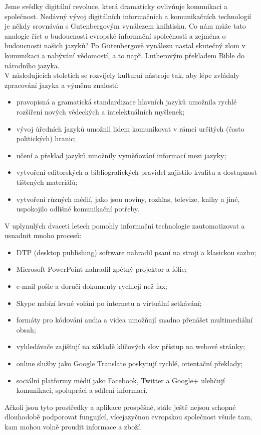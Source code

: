 \begin{multicols}{2}

Jsme svědky digitální revoluce, která dramaticky ovlivňuje komunikaci a společnost. Nedávný vývoj digitálních informačních a komunikačních technologií je někdy srovnáván s Gutenbergovým vynálezem knihtisku. Co nám může tato analogie říct o budoucnosti evropské informační společnosti a zejména o budoucnosti našich jazyků?
Po Gutenbergově vynálezu nastal skutečný zlom v komunikaci a nabývání vědomostí, a to např. Lutherovým překladem Bible do národního jazyka.\\ V následujících stoletích se rozvíjely kulturní nástroje tak, aby lépe zvládaly zpracování jazyka a výměnu znalostí:
    
    \begin{itemize}
      \item pravopisná a gramatická standardizace hlavních jazyků umožnila rychlé rozšíření nových vědeckých a intelektuálních myšlenek;
      \item vývoj úředních jazyků umožnil lidem komunikovat v rámci určitých (často politických) hranic;
      \item učení a překlad jazyků umožnily vyměňování informací mezi jazyky;
      \item vytvoření editorských a bibliografických pravidel zajistilo kvalitu a dostupnost tištených materiálů;
      \item vytvoření různých médií, jako jsou noviny, rozhlas, televize, knihy a jiné, uspokojilo odlišné komunikační potřeby.
    \end{itemize}
    
V uplynulých dvaceti letech pomohly informační technologie zautomatizovat a usnadnit mnoho procesů:\\

    \begin{itemize}
      \item DTP (desktop publishing) software nahradil psaní na stroji a klasickou sazbu;
      \item Microsoft PowerPoint nahradil zpětný projektor a fólie;
      \item e-mail pošle a doručí dokumenty rychleji než fax;
      \item Skype nabízí levné volání po internetu a virtuální setkávání;
      \item formáty pro kódování audia a videa umožňují snadno přenášet multimediální obsah;
      \item vyhledávače zajišťují na základě klíčových slov přístup na webové stránky;
      \item online služby jako Google Translate poskytují rychlé, orientační překlady;
      \item sociální platformy médií jako Facebook, Twitter a Google+ ulehčují komunikaci, spolupráci a sdílení informací.
    \end{itemize}
Ačkoli jsou tyto prostředky a aplikace prospěšné, stále ještě nejsou schopné dlouhodobě podporovat fungující, vícejazyčnou evropskou společnost všude tam, kam mohou volně proudit informace a zboží.
\pagebreak

\end{multicols}
